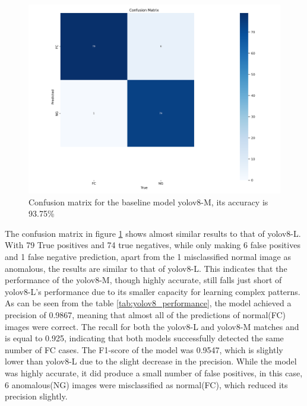 \begin{figure}[ht!]
    \centering
    \includegraphics[width=1.3\linewidth]{Rohit_Master_Thesis//Images/yolov8m_confusion_matrix.png}
    \caption{Confusion matrix for the baseline model \gls{yolo}v8-M, its accuracy is 93.75\%}
    \label{fig:yolov8m confusion matrix}
\end{figure}

The confusion matrix in figure \ref{fig:yolov8m confusion matrix} shows almost similar results to that of \gls{yolo}v8-L. With 79 True positives and 74 true negatives, while only making 6 false positives and 1 false negative prediction, apart from the 1 misclassified normal image as anomalous, the results are similar to that of \gls{yolo}v8-L. This indicates that the performance of the \gls{yolo}v8-M, though highly accurate, still falls just short of \gls{yolo}v8-L's performance due to its smaller capacity for learning complex patterns. As can be seen from the table \ref{tab:yolov8_performance}, the model achieved a precision of 0.9867, meaning that almost all of the predictions of normal(FC) images were correct. The recall for both the \gls{yolo}v8-L and \gls{yolo}v8-M matches and is equal to 0.925, indicating that both models successfully detected the same number of FC cases. The F1-score of the model was 0.9547, which is slightly lower than \gls{yolo}v8-L due to the slight decrease in the precision. While the model was highly accurate, it did produce a small number of false positives, in this case, 6 anomalous(NG) images were misclassified as normal(FC), which reduced its precision slightly.


